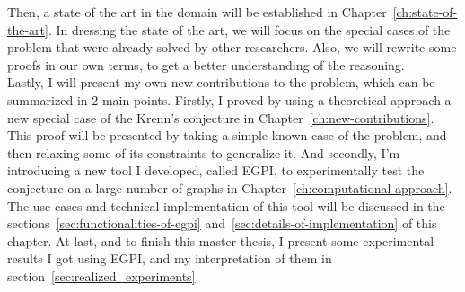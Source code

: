 Then, a state of the art in the domain will be established in Chapter~\ref{ch:state-of-the-art}.
In dressing the state of the art, we will focus on the special cases of the problem that were already solved by other researchers.
Also, we will rewrite some proofs in our own terms, to get a better understanding of the reasoning.\\

Lastly, I will present my own new contributions to the problem, which can be summarized in $2$ main points.
Firstly, I proved by using a theoretical approach a new special case of the Krenn's conjecture in Chapter~\ref{ch:new-contributions}.
This proof will be presented by taking a simple known case of the problem, and then relaxing some of its constraints to generalize it.
And secondly, I'm introducing a new tool I developed, called EGPI, to experimentally test the conjecture on a large number of graphs in Chapter~\ref{ch:computational-approach}.
The use cases and technical implementation of this tool will be discussed in the sections~\ref{sec:functionalities-of-egpi} and~\ref{sec:details-of-implementation} of this chapter.
At last, and to finish this master thesis, I present some experimental results I got using EGPI, and my interpretation of them in section~\ref{sec:realized_experiments}.\\
